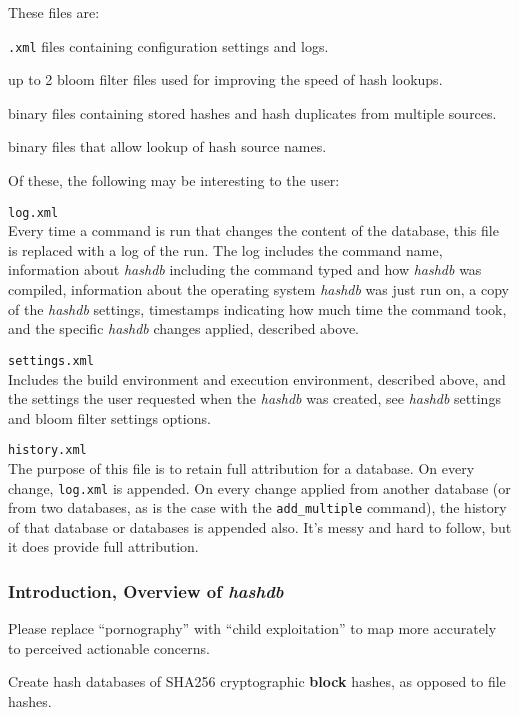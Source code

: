 \documentclass[12pt,twoside]{article}
\newcommand{\hdb}{\emph{hashdb}\xspace}
\begin{document}
These files are:
\begin{compactitem}
\item \texttt{.xml} files containing configuration settings and logs.
\item up to 2 bloom filter files used for improving the speed of hash lookups.
\item binary files containing stored hashes and hash duplicates
from multiple sources.
\item binary files that allow lookup of hash source names.
\end{compactitem}
Of these, the following may be interesting to the user:
\begin{compactitem}
\item \texttt{log.xml} \\
Every time a command is run that changes the content of the database,
this file is replaced with a log of the run.
The log includes
the command name, information about \hdb including the command typed
and how \hdb was compiled,
information about the operating system \hdb was just run on,
a copy of the \hdb settings,
timestamps indicating how much time the command took,
and the specific \hdb changes applied, described above.
\item \texttt{settings.xml} \\
Includes the build environment and execution environment,
described above,
and the settings the user requested when the \hdb was created,
see \hdb settings and bloom filter settings options.
\item \texttt{history.xml} \\
The purpose of this file is to retain full attribution for a database.
On every change, \texttt{log.xml} is appended.
On every change applied from another database
(or from two databases, as is the case with the \texttt{add\_multiple} command),
the history of that database or databases is appended also.
It's messy and hard to follow, but it does provide full attribution.
\end{compactitem}

\subsubsection*{Introduction, Overview of \hdb}
Please replace ``pornography'' with ``child exploitation''
to map more accurately to perceived actionable concerns.

Create hash databases of SHA256 cryptographic \textbf{block} hashes,
as opposed to file hashes.
\end{document}
